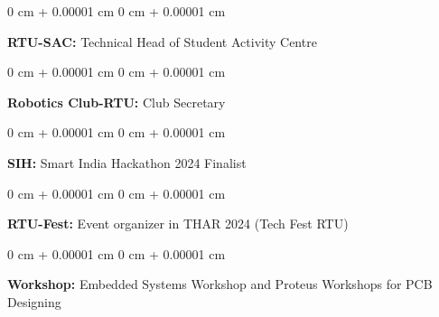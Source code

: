 \documentclass[10pt, letterpaper]{article}
\newenvironment{onecolentry}{
    \begin{adjustwidth}{
        0 cm + 0.00001 cm
    }{
        0 cm + 0.00001 cm
    }
}{
    \end{adjustwidth}
} %
\begin{document}
 \begin{onecolentry}
            \textbf{RTU-SAC: }Technical Head of Student Activity Centre
        \end{onecolentry}

        \vspace{2 pt}

         \begin{onecolentry}
            \textbf{Robotics Club-RTU: }Club Secretary
        \end{onecolentry}

        \vspace{2 pt}

         \begin{onecolentry}
            \textbf{SIH: }Smart India Hackathon 2024 Finalist
        \end{onecolentry}

          \vspace{2 pt}

         \begin{onecolentry}
            \textbf{RTU-Fest: }Event organizer in THAR 2024 (Tech Fest RTU)
        \end{onecolentry}

          \vspace{2 pt}

         \begin{onecolentry}
            \textbf{Workshop: }Embedded Systems Workshop  and Proteus Workshops for PCB Designing 
        \end{onecolentry}
    
\end{document}
